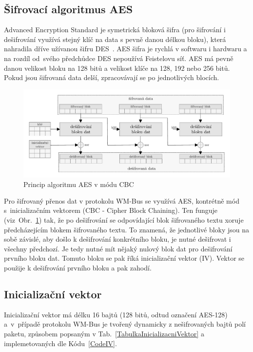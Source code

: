 \subsection{Šifrovací algoritmus AES}
Advanced Encryption Standard je symetrická bloková šifra (pro šifrování i dešifrování využívá stejný klíč na data s pevně danou délkou bloku), která nahradila dříve užívanou šifru DES~\cite{NormaFIPS}. AES šifra je rychlá v softwaru i hardwaru a na rozdíl od~svého předchůdce DES nepoužívá Feistelovu síť. AES má pevně danou velikost bloku na 128 bitů a velikost klíče na 128, 192 nebo 256 bitů.   Pokud jsou šifrovaná data delší, zpracovávají se po jednotlivých blocích. 

\begin{figure}[!ht]
\vspace{-10pt}
 \begin{center}
    \includegraphics[scale=0.65]{obrazky/wmbus_aes_cbc}
  \end{center}
	\vspace{-30pt}
  \caption{Princip algoritmu AES v módu CBC}
	\label{SchemaAEScbc}
	\vspace{-10pt}
\end{figure}

Pro šifrovaný přenos dat v protokolu WM-Bus se využívá AES, kontrétně mód s~inicializačním vektorem (CBC - Cipher Block Chaining). Ten funguje (viz~Obr.~\ref{SchemaAEScbc}) tak, že po dešifrování se odpovídající blok šifrovaného textu xoruje předcházejícím blokem šifrovaného textu. To znamená, že jednotlivé bloky jsou na sobě závislé, aby došlo k dešifrování konkrétního bloku, je nutné  dešifrovat i všechny předchozí. Je tedy nutné mít nějaký nulový blok dat pro dešifrování prvního bloku dat. Tomuto bloku se pak říká inicializační vektor (IV). Vektor se použije k dešifrování prvního bloku a pak zahodí.



\subsection{Inicializační vektor}
\label{KapitolaInicializacniVektor}
Inicializační vektor má délku 16 bajtů (128 bitů, odtud označení AES-128) a~v~případě protokolu WM-Bus je tvořený dynamicky z nešifrovaných bajtů polí paketu, způsobem popsaným v Tab.~\ref{TabulkaInicializacniVektor} a implemetovaných dle Kódu~\ref{CodeIV}.

